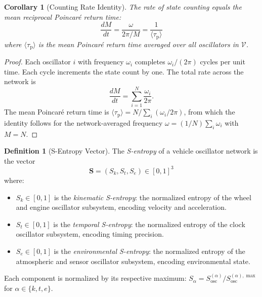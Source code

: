 \documentclass[twocolumn,10pt]{article}
\newtheorem{corollary}[theorem]{Corollary}
\theoremstyle{definition}
\newtheorem{definition}[theorem]{Definition}
\theoremstyle{remark}
\newcommand{\Sosc}{S_{\mathrm{osc}}}
\newcommand{\Sent}{\mathbf{S}}
\newcommand{\tauP}{\tau_{\mathrm{p}}}
\begin{document}
\begin{corollary}[Counting Rate Identity]\label{cor:counting-rate}
The rate of state counting equals the mean reciprocal Poincar\'e return time:
\begin{equation}\label{eq:counting-rate}
  \frac{dM}{dt} = \frac{\omega}{2\pi / M} = \frac{1}{\langle \tauP \rangle}
\end{equation}
where $\langle \tauP \rangle$ is the mean Poincar\'e return time averaged
over all oscillators in $\mathcal{V}$.
\end{corollary}

\begin{proof}
Each oscillator $i$ with frequency $\omega_i$ completes $\omega_i / (2\pi)$
cycles per unit time. Each cycle increments the state count by one. The
total rate across the network is
\begin{equation}
  \frac{dM}{dt} = \sum_{i=1}^N \frac{\omega_i}{2\pi}.
\end{equation}
The mean Poincar\'e return time is $\langle \tauP \rangle = N / \sum_i
(\omega_i / 2\pi)$, from which the identity follows for the network-averaged
frequency $\omega = (1/N)\sum_i \omega_i$ with $M = N$.
\end{proof}

\begin{definition}[S-Entropy Vector]\label{def:s-entropy}
The \emph{S-entropy} of a vehicle oscillator network is the vector
\begin{equation}\label{eq:s-entropy}
  \Sent = (S_k, S_t, S_e) \in [0,1]^3
\end{equation}
where:
\begin{itemize}
  \item $S_k \in [0,1]$ is the \emph{kinematic S-entropy}: the normalized
    entropy of the wheel and engine oscillator subsystem, encoding velocity
    and acceleration.
  \item $S_t \in [0,1]$ is the \emph{temporal S-entropy}: the normalized
    entropy of the clock oscillator subsystem, encoding timing precision.
  \item $S_e \in [0,1]$ is the \emph{environmental S-entropy}: the normalized
    entropy of the atmospheric and sensor oscillator subsystem, encoding
    environmental state.
\end{itemize}
Each component is normalized by its respective maximum:
$S_\alpha = \Sosc^{(\alpha)} / \Sosc^{(\alpha),\max}$ for
$\alpha \in \{k, t, e\}$.
\end{definition}
\end{document}
